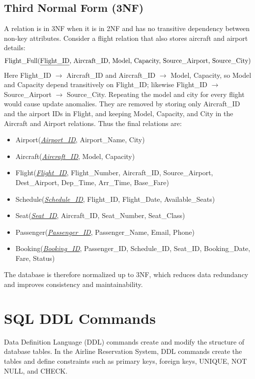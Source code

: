 \documentclass[12pt,a4paper]{article}
\newcommand{\pk}[1]{\textit{\underline{#1}}}
\begin{document}
\subsection{Third Normal Form (3NF)}
A relation is in 3NF when it is in 2NF and has no transitive dependency between non-key attributes.
Consider a flight relation that also stores aircraft and airport details:
\[
\text{Flight\_Full(\underline{Flight\_ID}, Aircraft\_ID, Model, Capacity, Source\_Airport, Source\_City)}
\]
Here Flight_ID $\rightarrow$ Aircraft_ID and Aircraft_ID $\rightarrow$ Model, Capacity, so Model and Capacity
depend transitively on Flight_ID; likewise Flight_ID $\rightarrow$ Source_Airport $\rightarrow$ Source_City.
Repeating the model and city for every flight would cause update anomalies. They are removed by storing
only Aircraft_ID and the airport IDs in Flight, and keeping Model, Capacity, and City in the Aircraft and
Airport relations. Thus the final relations are:
\begin{itemize}[nosep]
  \item Airport(\pk{Airport_ID}, Airport_Name, City)
  \item Aircraft(\pk{Aircraft_ID}, Model, Capacity)
  \item Flight(\pk{Flight_ID}, Flight_Number, Aircraft_ID, Source_Airport, Dest_Airport, Dep_Time, Arr_Time, Base_Fare)
  \item Schedule(\pk{Schedule_ID}, Flight_ID, Flight_Date, Available_Seats)
  \item Seat(\pk{Seat_ID}, Aircraft_ID, Seat_Number, Seat_Class)
  \item Passenger(\pk{Passenger_ID}, Passenger_Name, Email, Phone)
  \item Booking(\pk{Booking_ID}, Passenger_ID, Schedule_ID, Seat_ID, Booking_Date, Fare, Status)
\end{itemize}
The database is therefore normalized up to 3NF, which reduces data redundancy and improves consistency
and maintainability.

\section{SQL DDL Commands}
Data Definition Language (DDL) commands create and modify the structure of database tables. In the Airline
Reservation System, DDL commands create the tables and define constraints such as primary keys, foreign
keys, UNIQUE, NOT NULL, and CHECK.
\end{document}
